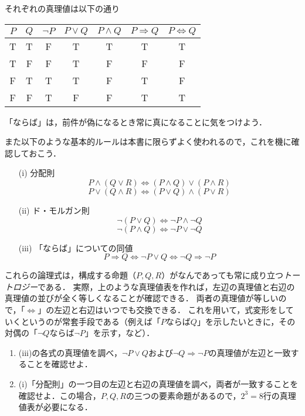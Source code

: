 \documentclass[11pt,a4paper]{jsarticle}
\begin{document}
それぞれの真理値は以下の通り

\begin{table}[h]
\centering
\begin{tabular}{cc|ccccc} \hline
 $P$ & $Q$ & $\neg P$ & $P \vee Q$ & $P \wedge Q$ & $P \Rightarrow Q$ & $P \iff Q$ \\ \hline 
 T  & T & F & T & T & T & T \\
 T  & F & F & T & F & F & F \\
 F  & T & T & T & F & T & F \\
 F  & F & T & F & F & T & T \\ \hline
\end{tabular} 
\end{table}

\begin{attn}
「ならば」は，前件が偽になるとき常に真になることに気をつけよう．
\end{attn}

また以下のような基本的ルールは本書に限らずよく使われるので，これを機に確認しておこう．
\begin{itemize}
    \item[(i)] 分配則
    \[ P \wedge ( Q \vee R ) \iff (P \wedge Q) \vee (P \wedge R) \]
    \[ P \vee ( Q \wedge R ) \iff (P \vee Q) \wedge (P \vee R) \]
    \item[(ii)] ド・モルガン則
    \[ \neg (P \vee Q) \iff \neg P \wedge \neg Q \]
    \[ \neg (P \wedge Q) \iff \neg P \vee \neg Q \]
    \item[(iii)] 「ならば」についての同値
    \[ P \Rightarrow Q \iff \neg P \vee Q \iff \neg Q \Rightarrow \neg P \] 
\end{itemize}

これらの論理式は，構成する命題（$P, Q, R$）がなんであっても常に成り立つ\emph{トートロジー}である．
実際，上のような真理値表を作れば，左辺の真理値と右辺の真理値の並びが全く等しくなることが確認できる．
両者の真理値が等しいので，「$\iff$」の左辺と右辺はいつでも交換できる．
これを用いて，式変形をしていくというのが常套手段である（例えば「$P$ならば$Q$」を示したいときに，その対偶の「$\neg Q$ならば$\neg P$」を示す，など）．


\begin{exercise} 
 \begin{enumerate}
     \item (iii)の各式の真理値を調べ，$\neg P \vee Q$および$\neg Q \Rightarrow \neg P$の真理値が左辺と一致することを確認せよ．
     \item (i)「分配則」の一つ目の左辺と右辺の真理値を調べ，両者が一致することを確認せよ．この場合，$P, Q, R$の三つの要素命題があるので，$2^3=8$行の真理値表が必要になる．
 \end{enumerate}
\end{exercise}
\end{document}
